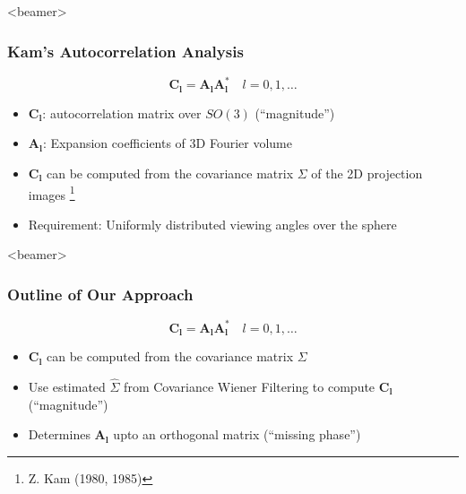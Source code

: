 \documentclass{beamer}
\newcommand\blfootnote[1]{%
  \begingroup
  \renewcommand\thefootnote{}\footnote{#1}%
  \addtocounter{footnote}{-1}%
  \endgroup
}
\newcommand{\bl}{\boldsymbol{l}}
\newcommand{\bC}{\boldsymbol{C}}
\def\bA{\boldsymbol{A}}
\def\bl{\boldsymbol{l}}
\begin{document}
\begin{frame}<beamer>
\frametitle{Kam's Autocorrelation Analysis}
\begin{equation*}
\label{eq:Cl}
\bC_{{\bl}}= \bA_{\bl} \bA_{\bl}^*  \quad l=0,1,\ldots
\end{equation*}

\begin{itemize}
\item $\bC_{\bl}$: autocorrelation matrix over $SO(3)$ (\alert{``magnitude''})
\item $\bA_{\bl}$: Expansion coefficients of 3D Fourier volume
\item $\bC_{\bl}$ can be computed from the covariance matrix $\Sigma$ of the 2D projection images \blfootnote{Z. Kam (1980, 1985)}
\item Requirement: Uniformly distributed viewing angles over the sphere
\end{itemize}
\end{frame}


\begin{frame}<beamer>
\frametitle{Outline of Our Approach}
\begin{equation*}
\label{eq:Cl}
\bC_{{\bl}}= \bA_{\bl} \bA_{\bl}^*  \quad l=0,1,\ldots
\end{equation*}

\begin{itemize}

\item $\bC_{\bl}$ can be computed from the covariance matrix $\Sigma$
\item Use estimated $\hat\Sigma$ from Covariance Wiener Filtering to compute $\bC_{\bl}$ (\alert{``magnitude''})
\item Determines $\bA_{\bl}$ upto an orthogonal matrix (\alert{``missing phase''})
\end{itemize}
\end{frame}

\end{document}
